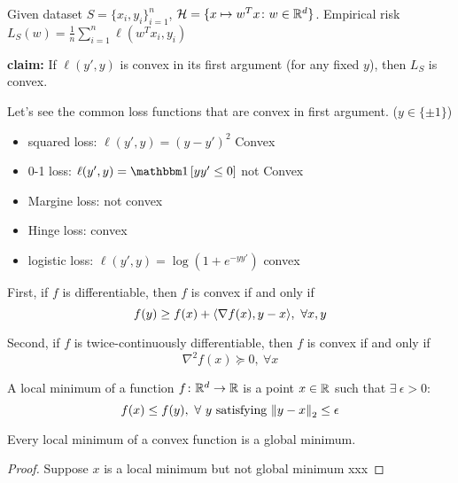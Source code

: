 \begin{eg} Given dataset \(S = \{x_i, y_i\}_{i=1}^n\), \(\mathcal{H} = \{x \mapsto w^T x \colon 
    w \in \mathbb{R}^d\}\). Empirical risk \(L_S(w) = \frac{1}{n} \sum_{i=1}^n \ell (w^Tx_i, y_i)\)

    \textbf{claim:} If \(\ell (y', y)\) is convex in its first argument (for any fixed \(y\)), 
    then \(L_S\) is convex. 
\end{eg}

Let's see the common loss functions that are convex in first argument. (\(y \in \{\pm 1\}\))

\begin{itemize}
    \item squared loss: \(\ell (y', y) = (y - y')^2\) Convex 
    \item 0-1 loss: \(\ell(y', y) = \indi \midBrac{yy' \leq 0}\) not Convex 
    \item Margine loss: not convex 
    \item Hinge loss: convex 
    \item logistic loss: \(\ell (y', y) = \log (1 + e^{-yy'})\) convex 
\end{itemize}

\begin{lemma}
    First, if \(f\) is differentiable, then \(f\) is convex if and only if 
    \[
        f(y) \geq f(x) + \langle \nabla f(x), y - x \rangle, \ \forall x, y  
    \]

    Second, if \(f\) is twice-continuously differentiable, then \(f\) is convex if and only if 
    \[
        \nabla^2 f(x) \succeq 0, \ \forall x   
    \]
\end{lemma}

\begin{definition} 
    A local minimum of a function \(f \colon \mathbb{R}^d \to \mathbb{R}\) is a point \(x \in \mathbb{R}\) such that 
    \(\exists  \ \epsilon > 0\): 
    \[
        f(x) \leq f(y), \ \forall \ y \text{ satisfying } \norm{y-x}_2 \leq \epsilon
    \]
\end{definition}


\begin{lemma}
    Every local minimum of a convex function is a global minimum. 
\end{lemma}
\begin{proof}
    Suppose \(x\) is a local minimum but not global minimum  xxx 
\end{proof}

